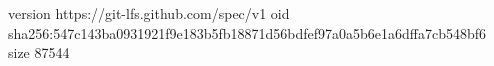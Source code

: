 version https://git-lfs.github.com/spec/v1
oid sha256:547c143ba0931921f9e183b5fb18871d56bdfef97a0a5b6e1a6dffa7cb548bf6
size 87544
